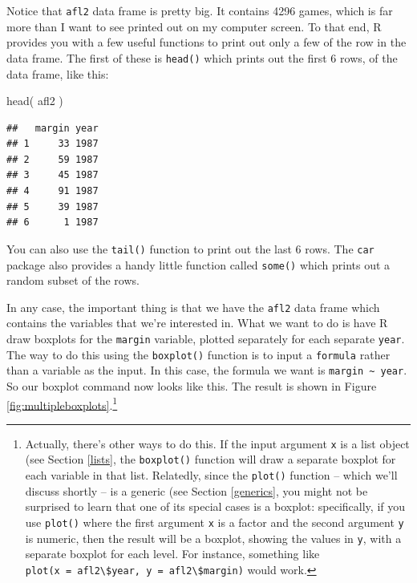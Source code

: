\documentclass[
]{book}
\newenvironment{Shaded}{\begin{snugshade}}{\end{snugshade}}
\newcommand{\FunctionTok}[1]{\textcolor[rgb]{0.00,0.00,0.00}{#1}}
\newcommand{\NormalTok}[1]{#1}
\begin{document}
Notice that \texttt{afl2} data frame is pretty big. It contains 4296 games, which is far more than I want to see printed out on my computer screen. To that end, R provides you with a few useful functions to print out only a few of the row in the data frame. The first of these is \texttt{head()} which prints out the first 6 rows, of the data frame, like this:

\begin{Shaded}
\begin{Highlighting}[]
\FunctionTok{head}\NormalTok{( afl2 )}
\end{Highlighting}
\end{Shaded}

\begin{verbatim}
##   margin year
## 1     33 1987
## 2     59 1987
## 3     45 1987
## 4     91 1987
## 5     39 1987
## 6      1 1987
\end{verbatim}

You can also use the \texttt{tail()} function to print out the last 6 rows. The \texttt{car} package also provides a handy little function called \texttt{some()} which prints out a random subset of the rows.

In any case, the important thing is that we have the \texttt{afl2} data frame which contains the variables that we're interested in. What we want to do is have R draw boxplots for the \texttt{margin} variable, plotted separately for each separate \texttt{year}. The way to do this using the \texttt{boxplot()} function is to input a \texttt{formula} rather than a variable as the input. In this case, the formula we want is \texttt{margin\ \textasciitilde{}\ year}. So our boxplot command now looks like this. The result is shown in Figure \ref{fig:multipleboxplots}.\footnote{Actually, there's other ways to do this. If the input argument \texttt{x} is a list object (see Section \ref{lists}, the \texttt{boxplot()} function will draw a separate boxplot for each variable in that list. Relatedly, since the \texttt{plot()} function -- which we'll discuss shortly -- is a generic (see Section \ref{generics}, you might not be surprised to learn that one of its special cases is a boxplot: specifically, if you use \texttt{plot()} where the first argument \texttt{x} is a factor and the second argument \texttt{y} is numeric, then the result will be a boxplot, showing the values in \texttt{y}, with a separate boxplot for each level. For instance, something like \texttt{plot(x\ =\ afl2\textbackslash{}\$year,\ y\ =\ afl2\textbackslash{}\$margin)} would work.}
\end{document}
